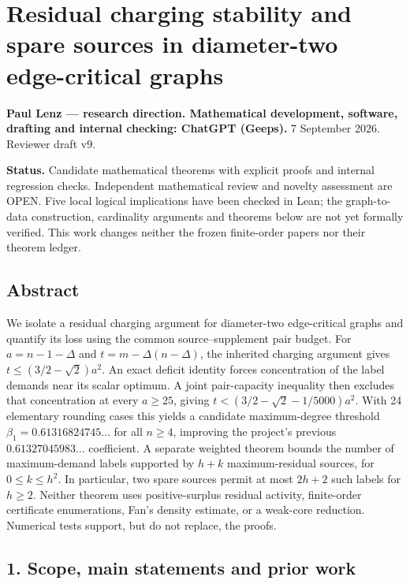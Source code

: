 \documentclass[
  11pt,
  a4paper,
]{article}
\author{}
\date{}
\begin{document}
\section{Residual charging stability and spare sources in diameter-two
edge-critical
graphs}\label{residual-charging-stability-and-spare-sources-in-diameter-two-edge-critical-graphs}

\textbf{Paul Lenz --- research direction. Mathematical development,
software, drafting and internal checking: ChatGPT (Geeps).} 7 September
2026. Reviewer draft v9.

\textbf{Status.} Candidate mathematical theorems with explicit proofs
and internal regression checks. Independent mathematical review and
novelty assessment are OPEN. Five local logical implications have been
checked in Lean; the graph-to-data construction, cardinality arguments
and theorems below are not yet formally verified. This work changes
neither the frozen finite-order papers nor their theorem ledger.

\subsection{Abstract}\label{abstract}

We isolate a residual charging argument for diameter-two edge-critical
graphs and quantify its loss using the common source--supplement pair
budget. For \(a=n-1-\Delta\) and \(t=m-\Delta(n-\Delta)\), the inherited
charging argument gives \(t\le(3/2-\sqrt2)a^2\). An exact deficit
identity forces concentration of the label demands near its scalar
optimum. A joint pair-capacity inequality then excludes that
concentration at every \(a\ge25\), giving \(t<(3/2-\sqrt2-1/5000)a^2\).
With 24 elementary rounding cases this yields a candidate maximum-degree
threshold \(\beta_1=0.61316824745\ldots\) for all \(n\ge4\), improving
the project's previous \(0.61327045983\ldots\) coefficient. A separate
weighted theorem bounds the number of maximum-demand labels supported by
\(h+k\) maximum-residual sources, for \(0\le k\le h^2\). In particular,
two spare sources permit at most \(2h+2\) such labels for \(h\ge2\).
Neither theorem uses positive-surplus residual activity, finite-order
certificate enumerations, Fan's density estimate, or a weak-core
reduction. Numerical tests support, but do not replace, the proofs.

\subsection{1. Scope, main statements and prior
work}\label{scope-main-statements-and-prior-work}
\end{document}
